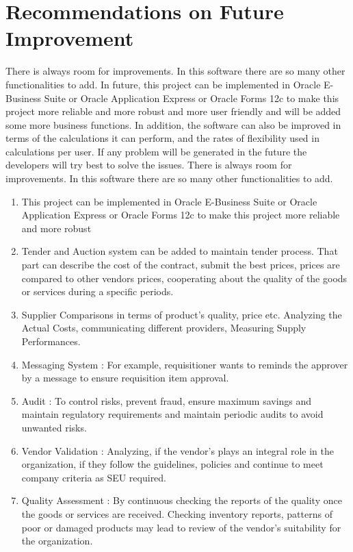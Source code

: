 \documentclass[12pt]{report} %
\begin{document}
\section*{Recommendations on Future Improvement}
\ifx
There is always room for improvements. In this software there are so many other functionalities to add. In future, this project can be implemented in Oracle E-Business Suite or Oracle Application Express or  Oracle Forms 12c to make this project more reliable and more robust and more user friendly and will be added some more business functions. In addition, the software can also be improved in terms of the calculations it can perform, and the rates of flexibility used in calculations per user. If any problem will be generated in the future the developers will try best to solve the issues. 
\fi
There is always room for improvements. In this software there are so many other functionalities to add.


\renewcommand{\labelenumi}{\alph{enumi})}
\begin{enumerate}
	\item This project can be implemented in Oracle E-Business Suite or Oracle Application Express or  Oracle Forms 12c to make this project more reliable and more robust
	\item Tender and Auction system can be added to maintain tender process. That part can describe the cost of the contract, submit the best prices, prices are compared to other vendors prices, cooperating about the quality of the goods or services during a specific periods.
	\item Supplier Comparisons in terms of product's quality, price etc. Analyzing the Actual Costs, communicating different providers, Measuring Supply Performances. 
	\item Messaging System : For example, requisitioner wants to reminds the approver by a message to ensure requisition item approval.
	\item Audit : To control risks, prevent fraud, ensure maximum savings and maintain regulatory requirements and maintain periodic audits to avoid unwanted risks. 
	\item Vendor Validation : Analyzing, if the vendor's plays an integral role in the organization, if they follow the guidelines, policies and continue to meet company criteria as SEU required.
	\item Quality Assessment : By continuous checking the reports of the quality once the goods or services are received. Checking inventory reports, patterns of poor or damaged products may lead to review of the vendor's suitability for the organization.
	
\end{enumerate}
\end{document}
